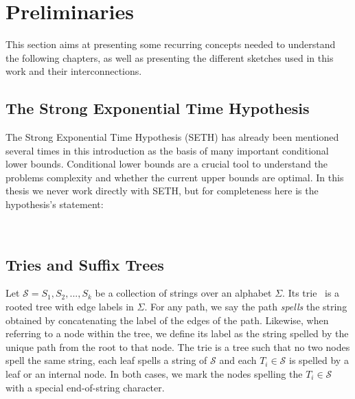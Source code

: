 \section{Preliminaries}\label{sec:prelim}

This section aims at presenting some recurring concepts needed to understand the following chapters, as well as presenting the different sketches used in this work and their interconnections.

\subsection{The Strong Exponential Time Hypothesis}\label{sec:prelim:seth}

The Strong Exponential Time Hypothesis (SETH) has already been mentioned several times in this introduction as the basis of many important conditional lower bounds. Conditional lower bounds are a crucial tool to understand the problems complexity and whether the current upper bounds are optimal. In this thesis we never work directly with SETH, but for completeness here is the hypothesis's statement:

\\

\subsection{Tries and Suffix Trees}\label{sec:prelim:tries}
Let $\mathcal{S} = {S_1,S_2, ..., S_k}$ be a collection of strings over an alphabet $\Sigma$. Its trie~\cite{thue1912gegenseitige,de1959file,fredkin1960trie} is a rooted tree with edge labels in $\Sigma$.
For any path, we say the path \emph{spells} the string obtained by concatenating the label of the edges of the path.
Likewise, when referring to a node within the tree, we define its label as the string spelled by the unique path from the root to that node.
The trie is a tree such that no two nodes spell the same string, each leaf spells a string of $\mathcal{S}$ and each $T_i \in \mathcal{S}$ is spelled by a leaf or an internal node. In both cases, we mark the nodes spelling the $T_i \in \mathcal{S}$  with a special end-of-string character.

